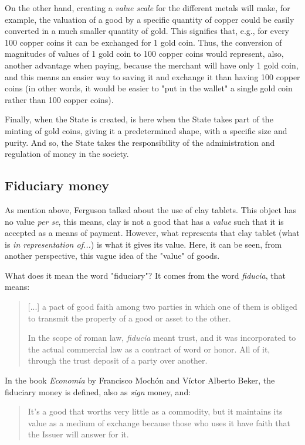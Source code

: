 \documentclass[12pt,a4paper,twoside]{book}
\begin{document}
On the other hand, creating a \textit{value scale} for the different metals will make, for example, the valuation of a good by a specific quantity of copper could be easily converted in a much smaller quantity of gold. This signifies that, e.g., for every 100 copper coins it can be exchanged for 1 gold coin. Thus, the conversion of magnitudes of values of 1 gold coin to 100 copper coins would represent, also, another advantage when paying, because the merchant will have only 1 gold coin, and this means an easier way to saving it and exchange it than having 100 copper coins (in other words, it would be easier to "put in the wallet" a single gold coin rather than 100 copper coins).

Finally, when the State is created, is here when the State takes part of the minting of gold coins, giving it a predetermined shape, with a specific size and purity. And so, the State takes the responsibility of the administration and regulation of money in the society.

\subsection{Fiduciary money}
As mention above, Ferguson talked about the use of clay tablets. This object has no value \textit{per se}, this means, clay is not a good that has a \textit{value} such that it is accepted as a means of payment. However, what represents that clay tablet (what is \textit{in representation of...}) is what it gives its value. Here, it can be seen, from another perspective, this vague idea of the "value" of goods.

What does it mean the word "fiduciary"? It comes from the word \textit{fiducia}, that means:

\begin{quotation}
[...] a pact of good faith among two parties in which one of them is obliged to transmit the property of a good or asset to the other.

In the scope of roman law, \textit{fiducia} meant trust, and it was incorporated to the actual commercial law as a contract of word or honor. All of it, through the trust deposit of a party over another. \cite{epedia:fiducia}
\end{quotation}

In the book \textit{Economía} by Francisco Mochón and Víctor Alberto Beker, the fiduciary money is defined, also as \textit{sign} money, and:

\begin{quote}
It's a good that worths very little as a commodity, but it maintains its value as a medium of exchange because those who uses it have faith that the Issuer will answer for it. \cite[p. 265]{mochobeker}
\end{quote}
\end{document}
